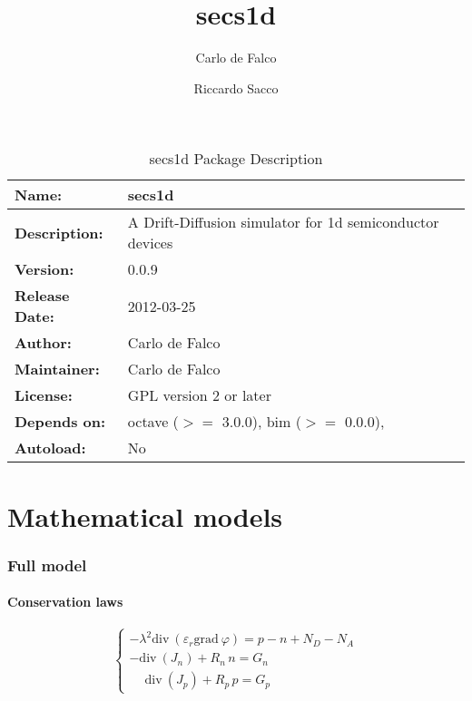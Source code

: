 \documentclass[10pt]{article}
\title{secs1d}
\author{Carlo de Falco \and Riccardo Sacco}
\begin{document}
\maketitle
\tableofcontents

\begin{table}
\caption{secs1d Package Description}
\centering
\begin{tabular}{|l|l|}
\hline
{\bf Name: } & secs1d\\  \hline
{\bf Description: } &
A Drift-Diffusion simulator for 1d semiconductor devices\\  \hline
{\bf Version: } & 0.0.9\\  \hline
{\bf Release Date: } & 2012-03-25\\  \hline
{\bf Author: } & Carlo de Falco\\   \hline
{\bf Maintainer: } & Carlo de Falco\\  \hline
{\bf License: } & GPL version 2 or later\\  \hline
{\bf Depends on: } &
octave ($>=$ 3.0.0), bim ($>=$ 0.0.0), \\  \hline
{\bf Autoload: } &No\\  \hline
\end{tabular}
\end{table}

\part{Mathematical models}

\section{Full model}
\subsection{Conservation laws}

\begin{equation}\label{eq:conservation}
\left\{
\begin{array}{ll}
-\lambda^{2}\mathrm{div}\ \left(\varepsilon_{r} \mathrm{grad}\ 
\varphi \right) = p - n + N_{D} - N_{A} \\[5mm]
-\mathrm{div}\ \left(J_{n} \right) + R_{n} \, n = G_{n} \\[5mm]
\phantom{-}\mathrm{div}\ \left(J_{p} \right) + R_{p} \, p = G_{p}
\end{array}
\right.
\end{equation}
\end{document}
